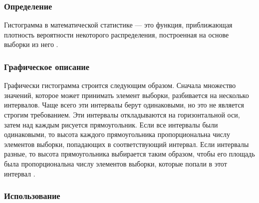 \subsubsection{Определение}

Гистограмма в математической статистике --- это функция, приближающая плотность вероятности некоторого распределения, построенная на основе выборки из него \cite{s:hist}.

\subsubsection{Графическое описание}

Графически гистограмма строится следующим образом. Сначала множество значений, которое может принимать элемент выборки, разбивается на несколько интервалов. Чаще всего эти интервалы берут одинаковыми, но это не является строгим требованием. Эти интервалы откладываются на горизонтальной оси, затем над каждым рисуется прямоугольник. Если все интервалы были одинаковыми, то высота каждого прямоугольника пропорциональна числу элементов выборки, попадающих в соответствующий интервал. Если интервалы разные, то высота прямоугольника выбирается таким образом, чтобы его площадь была пропорциональна числу элементов выборки, которые попали в этот интервал \cite{s:hist}.

\subsubsection{Использование}

